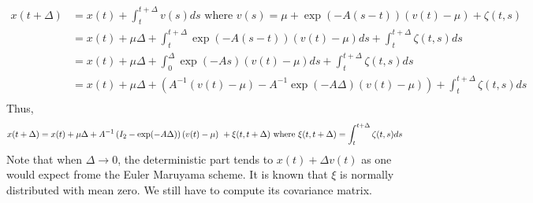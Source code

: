 \documentclass[11pt]{article}
\newcommand {\1}{\mathbb{1}}
\begin{document}
\begin{align*}
	x(t+\Delta)&=x(t)+\int_t^{t+\Delta} v(s) ds \mbox{ where } v(s)=\mu+\exp(-A(s-t))(v(t)-\mu)+\zeta(t,s) \\
	&= x(t)+\mu \Delta+\int_t^{t+\Delta} \exp(-A(s-t))(v(t)-\mu) ds +\int_t^{t+\Delta} \zeta(t,s) ds \\
	&= x(t)+\mu \Delta +\int_0^{\Delta} \exp(-As)(v(t)-\mu) ds +\int_t^{t+\Delta} \zeta(t,s) ds \\
	&=x(t)+\mu \Delta + (A^{-1}(v(t)-\mu)-A^{-1}\exp(-A\Delta)(v(t)-\mu))+\int_t^{t+\Delta} \zeta(t,s) ds \\
\end{align*}
Thus, 
\begin{equation}
	x(t+\Delta)=x(t)+\mu \Delta+A^{-1} \left( I_2-\exp(-A\Delta)\right)(v(t)-\mu) +\xi(t,t+\Delta) \\
	\mbox{ where } \xi(t,t+\Delta)=\int_t^{t+\Delta} \zeta(t,s)ds
\end{equation}
Note that when $\Delta \rightarrow 0$, the deterministic part tends to $x(t)+\Delta v(t)$ as one would expect frome the Euler Maruyama scheme.
It is known that $\xi$ is normally distributed with mean zero. We still have to compute its covariance matrix.
\end{document}
